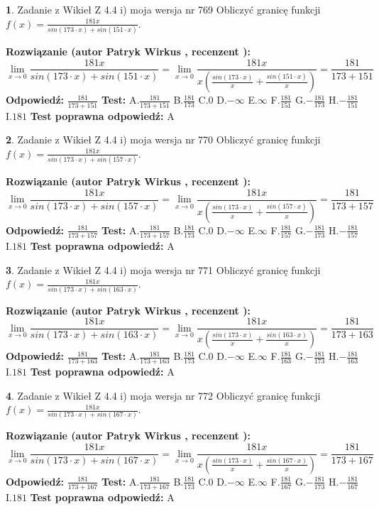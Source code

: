 \documentclass[12pt, a4paper]{article}
\theoremstyle{definition} %
\newtheorem{zad}{}
\newcommand{\zadStart}[1]{\begin{zad}#1\newline}
\newcommand{\zadStop}{\end{zad}}
\newcommand{\rozwStart}[2]{\noindent \textbf{Rozwiązanie (autor #1 , recenzent #2): }\newline}
\newcommand{\rozwStop}{\newline}
\newcommand{\odpStart}{\noindent \textbf{Odpowiedź:}\newline}
\newcommand{\odpStop}{\newline}
\newcommand{\testStart}{\noindent \textbf{Test:}\newline}
\newcommand{\testStop}{\newline}
\newcommand{\kluczStart}{\noindent \textbf{Test poprawna odpowiedź:}\newline}
\newcommand{\kluczStop}{\newline}
\begin{document}
\zadStart{Zadanie z Wikieł Z 4.4 i) moja wersja nr 769}
Obliczyć granicę funkcji $f(x)=\frac{181x}{sin(173\cdot x) +sin(151\cdot x)}$.
\zadStop
\rozwStart{Patryk Wirkus}{}
$$\lim\limits_{x\to 0}\frac{181x}{sin(173\cdot x) +sin(151\cdot x)}=\lim\limits_{x\to 0}\frac{181x}{x(\frac{sin(173\cdot x)}{x}+\frac{sin(151\cdot x)}{x})}=\frac{181}{173+151}$$
\rozwStop
\odpStart
$\frac{181}{173+151}$
\odpStop
\testStart
A.$\frac{181}{173+151}$
B.$\frac{181}{173}$
C.$0$
D.$-\infty$
E.$\infty$
F.$\frac{181}{151}$
G.$-\frac{181}{173}$
H.$-\frac{181}{151}$
I.$181$
\testStop
\kluczStart
A
\kluczStop



\zadStart{Zadanie z Wikieł Z 4.4 i) moja wersja nr 770}
Obliczyć granicę funkcji $f(x)=\frac{181x}{sin(173\cdot x) +sin(157\cdot x)}$.
\zadStop
\rozwStart{Patryk Wirkus}{}
$$\lim\limits_{x\to 0}\frac{181x}{sin(173\cdot x) +sin(157\cdot x)}=\lim\limits_{x\to 0}\frac{181x}{x(\frac{sin(173\cdot x)}{x}+\frac{sin(157\cdot x)}{x})}=\frac{181}{173+157}$$
\rozwStop
\odpStart
$\frac{181}{173+157}$
\odpStop
\testStart
A.$\frac{181}{173+157}$
B.$\frac{181}{173}$
C.$0$
D.$-\infty$
E.$\infty$
F.$\frac{181}{157}$
G.$-\frac{181}{173}$
H.$-\frac{181}{157}$
I.$181$
\testStop
\kluczStart
A
\kluczStop



\zadStart{Zadanie z Wikieł Z 4.4 i) moja wersja nr 771}
Obliczyć granicę funkcji $f(x)=\frac{181x}{sin(173\cdot x) +sin(163\cdot x)}$.
\zadStop
\rozwStart{Patryk Wirkus}{}
$$\lim\limits_{x\to 0}\frac{181x}{sin(173\cdot x) +sin(163\cdot x)}=\lim\limits_{x\to 0}\frac{181x}{x(\frac{sin(173\cdot x)}{x}+\frac{sin(163\cdot x)}{x})}=\frac{181}{173+163}$$
\rozwStop
\odpStart
$\frac{181}{173+163}$
\odpStop
\testStart
A.$\frac{181}{173+163}$
B.$\frac{181}{173}$
C.$0$
D.$-\infty$
E.$\infty$
F.$\frac{181}{163}$
G.$-\frac{181}{173}$
H.$-\frac{181}{163}$
I.$181$
\testStop
\kluczStart
A
\kluczStop



\zadStart{Zadanie z Wikieł Z 4.4 i) moja wersja nr 772}
Obliczyć granicę funkcji $f(x)=\frac{181x}{sin(173\cdot x) +sin(167\cdot x)}$.
\zadStop
\rozwStart{Patryk Wirkus}{}
$$\lim\limits_{x\to 0}\frac{181x}{sin(173\cdot x) +sin(167\cdot x)}=\lim\limits_{x\to 0}\frac{181x}{x(\frac{sin(173\cdot x)}{x}+\frac{sin(167\cdot x)}{x})}=\frac{181}{173+167}$$
\rozwStop
\odpStart
$\frac{181}{173+167}$
\odpStop
\testStart
A.$\frac{181}{173+167}$
B.$\frac{181}{173}$
C.$0$
D.$-\infty$
E.$\infty$
F.$\frac{181}{167}$
G.$-\frac{181}{173}$
H.$-\frac{181}{167}$
I.$181$
\testStop
\kluczStart
A
\kluczStop
\end{document}
